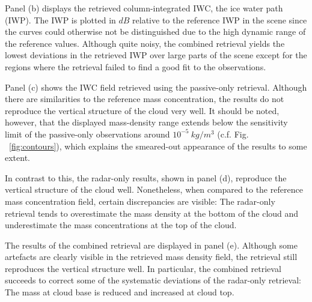 \documentclass[journal abbreviation, manuscript]{copernicus}
\begin{document}
Panel (b) displays the retrieved column-integrated IWC, the ice water path
(IWP). The IWP is plotted in $\unit{dB}$ relative to the reference IWP in the
scene since the curves could otherwise not be distinguished due to the high
dynamic range of the reference values. Although quite noisy, the combined
retrieval yields the lowest deviations in the retrieved IWP over large parts of
the scene except for the regions where the retrieval failed to find a good fit
to the observations.

Panel (c) shows the IWC field retrieved using the passive-only retrieval.
Although there are similarities to the reference mass concentration, the results
do not reproduce the vertical structure of the cloud very well. It should be
noted, however, that the displayed mass-density range extends below the
sensitivity limit of the passive-only observations around
$10^{-5}\ \unit{kg/m^3}$ (c.f. Fig. ~\ref{fig:contours}), which explains the
smeared-out appearance of the results to some extent.

In contrast to this, the radar-only results, shown in panel (d), reproduce the
vertical structure of the cloud well. Nonetheless, when compared to the
reference mass concentration field, certain discrepancies are visible: The
radar-only retrieval tends to overestimate the mass density at the bottom
of the cloud and underestimate the mass concentrations at the top of the cloud.

The results of the combined retrieval are displayed in panel (e). Although some
artefacts are clearly visible in the retrieved mass density field, the retrieval
still reproduces the vertical structure well. In particular, the combined
retrieval succeeds to correct some of the systematic deviations of the
radar-only retrieval: The mass at cloud base is reduced and increased at cloud
top.
\end{document}
